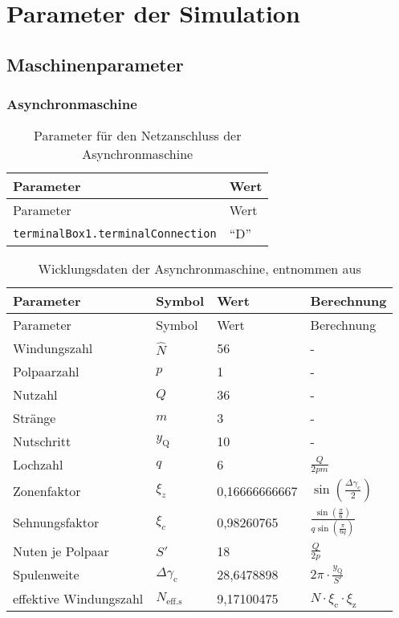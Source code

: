 \chapter{Parameter der Simulation}
\label{chap:ParameterDerSimulation}

\section{Maschinenparameter}\label{sec:maschinenparameter}

\subsection{Asynchronmaschine}\label{subsec:asynchronmaschine}


\begin{longtable}[]{@{}ll@{}}
\caption{Parameter für den Netzanschluss der
Asynchronmaschine}\tabularnewline
\toprule
Parameter & Wert\tabularnewline
\midrule
\endfirsthead
\toprule
Parameter & Wert\tabularnewline
\midrule
\endhead
\texttt{terminalBox1.terminalConnection} & ``D''\tabularnewline
\bottomrule
\end{longtable}

\begin{longtable}[]{@{}llll@{}}
\caption{Wicklungsdaten der Asynchronmaschine, entnommen aus \cite{pillerpowersystemsASMTIF2004}}\label{tab:WicklungsdatenASM}\tabularnewline
\toprule
Parameter              & Symbol                    & Wert          & Berechnung\tabularnewline
\midrule
\endfirsthead
\toprule
Parameter              & Symbol                    & Wert          & Berechnung\tabularnewline
\midrule
\endhead
Windungszahl           & $\hat N$                  & 56            & -\tabularnewline
Polpaarzahl            & $p$                       & 1             & -\tabularnewline
Nutzahl                & $Q$                       & 36            & -\tabularnewline
Stränge                & $m$                       & 3             & -\tabularnewline
Nutschritt             & $y_\mathrm{Q}$            & 10            & -\tabularnewline\midrule
Lochzahl               & $q$                       & 6             & $\frac{Q}{2pm}$\tabularnewline
Zonenfaktor            & $\xi_z$                   & 0,16666666667 & $\sin(\frac{\Delta\gamma _{\mathrm{c}}}{2})$\tabularnewline
Sehnungsfaktor         & $\xi_c$                   & 0,98260765    & $\frac{\sin(\frac{\pi}{6})}{q\sin(\frac{\pi}{6q})}$\tabularnewline
Nuten je Polpaar       & $S'$                      & 18            & $\frac{Q}{2p}$\tabularnewline
Spulenweite            & $\Delta\gamma_\mathrm{c}$ & 28,6478898    & $2\pi\cdot\frac{y_\mathrm{Q}}{S'}$\tabularnewline
effektive Windungszahl & $N_\mathrm{eff.s}$        & 9,17100475    & $\hat N\cdot\xi_\mathrm{c}\cdot\xi_\mathrm{z}$\tabularnewline
\bottomrule
\end{longtable}

